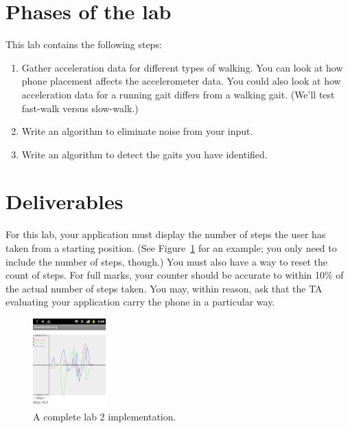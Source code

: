\documentclass[10pt]{article}
\newcommand{\todo}[1]{{\red\textbf{TODO: }#1}\xspace}
\begin{document}
\newpage
\section{Phases of the lab}
This lab contains the following steps:

\begin{enumerate}
\item Gather acceleration data for different types of walking. You can look at how phone placement affects the accelerometer data. You could also look at how acceleration data for a running gait differs from a walking gait. (We'll test fast-walk versus slow-walk.)
\item Write an algorithm to eliminate noise from your input.
\item Write an algorithm to detect the gaits you have identified.
\end{enumerate}

\section{Deliverables}
For this lab, your application must display the number of steps the user has taken from a starting position. (See Figure~\ref{fig:lab-2-screen} for an example; you only need to include the number of steps, though.) You must also have a way to reset the count of steps. For full marks, your counter should be accurate to within 10\% of the actual number of steps taken. You may, within reason, ask that the TA evaluating your application carry the phone in a particular way.

\begin{figure}[h]
\begin{center}
\includegraphics[width=0.25\textwidth]{device-screenshot-lab-2.png}
\end{center}
\caption{\label{fig:lab-2-screen}A complete lab 2 implementation.}
\end{figure}
\end{document}
